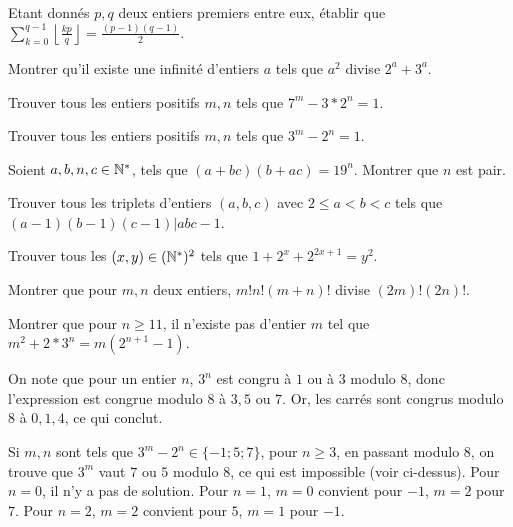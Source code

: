 		\begin{exo}
				Etant donnés $p,q$ deux entiers premiers entre eux, établir que $\sum \limits_{k=0}^{q-1}{\left\lfloor \frac{kp}{q}\right\rfloor}=\frac{(p-1)(q-1)}{2}$.
		\end{exo}

		\begin{exo}
				Montrer qu'il existe une infinité d'entiers $a$ tels que $a^2$ divise $2^a+3^a$. 
		\end{exo}

		\begin{exo}
				Trouver tous les entiers positifs $m,n$ tels que $7^m-3*2^n=1$.
		\end{exo}

		\begin{exo}
				Trouver tous les entiers positifs $m,n$ tels que $3^m-2^n=1$. 
		\end{exo}

		\begin{exo}
				Soient $a,b,n,c \in \mathbb{N}^*$, tels que $(a+bc)(b+ac)=19^n$. Montrer que $n$ est pair. 
		\end{exo}

		\begin{exo}
				Trouver tous les triplets d'entiers $(a,b,c)$ avec $2 \leq a < b < c$ tels que $(a-1)(b-1)(c-1)|abc-1$. 
		\end{exo}

		\begin{exo}
				Trouver tous les $(x,y) \in (\mathbb{N}^*)^2$ tels que $1+2^x+2^{2x+1}=y^2$. 
		\end{exo}

		\begin{exo}
				Montrer que pour $m,n$ deux entiers, $m!n!(m+n)!$ divise $(2m)!(2n)!$. 
		\end{exo}

		\begin{exo}
				Montrer que pour $n \geq 11$, il n'existe pas d'entier $m$ tel que $m^2+2*3^n=m(2^{n+1}-1)$. 
		\end{exo}
		
		\begin{sol}[1]
		On note que pour un entier $n$, $3^n$ est congru \`a $1$ ou \`a $3$ modulo $8$, donc l'expression est congrue modulo $8$ \`a $3,5$ ou $7$. Or, les carr\'es sont congrus modulo $8$ \`a $0,1,4$, ce qui conclut.
\end{sol}

\begin{sol}[2]
		Si $m,n$ sont tels que $3^m-2^n \in \{-1;5;7\}$, pour $n \geq 3$, en passant modulo $8$, on trouve que $3^m$ vaut $7$ ou $5$ modulo $8$, ce qui est impossible (voir ci-dessus). Pour $n=0$, il n'y a pas de solution. Pour $n=1$, $m=0$ convient pour $-1$, $m=2$ pour $7$. Pour $n=2$, $m=2$ convient pour $5$, $m=1$ pour $-1$. 
\end{sol}


